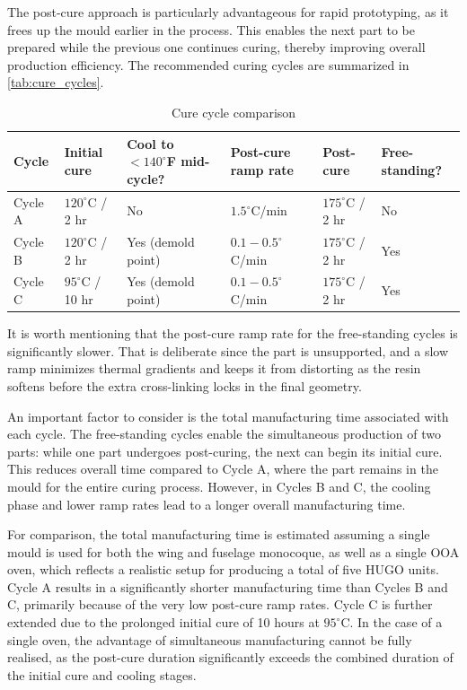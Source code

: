 The post-cure approach is particularly advantageous for rapid prototyping, as it frees up the mould earlier in the process. This enables the next part to be prepared while the previous one continues curing, thereby improving overall production efficiency. The recommended curing cycles are summarized in \autoref{tab:cure_cycles}.

\begin{table}[H]
\centering
\caption{Cure cycle comparison }
\label{tab:cure_cycles}
\begin{tabular}{|p{1.4cm}|p{2.0cm}|p{3.0cm}|p{2.6cm}|p{2.0cm}|p{2.2cm}|}
\hline
\textbf{Cycle} &
\textbf{Initial cure} &
\textbf{Cool to $<140^\circ$F mid-cycle?} &
\textbf{Post-cure ramp rate} &
\textbf{Post-cure} &
\textbf{Free-standing?} \\
\hline\hline
Cycle A & $120^\circ$C / 2 hr & No & $1.5^\circ$C/min & $175^\circ$C / 2 hr & No \\
\hline
Cycle B & $120^\circ$C / 2 hr & Yes (demold point) & $0.1-0.5^\circ$C/min & $175^\circ$C / 2 hr & Yes \\
\hline
Cycle C & $95^\circ$C / 10 hr & Yes (demold point) & $0.1-0.5^\circ$C/min & $175^\circ$C / 2 hr & Yes \\
\hline
\end{tabular}
\end{table}

It is worth mentioning that the post-cure ramp rate for the free-standing cycles is significantly slower. That is deliberate since the part is unsupported, and a slow ramp minimizes thermal gradients and keeps it from distorting as the resin softens before the extra cross-linking locks in the final geometry. 

An important factor to consider is the total manufacturing time associated with each cycle. The free-standing cycles enable the simultaneous production of two parts: while one part undergoes post-curing, the next can begin its initial cure. This reduces overall time compared to Cycle A, where the part remains in the mould for the entire curing process. However, in Cycles B and C, the cooling phase and lower ramp rates lead to a longer overall manufacturing time.

For comparison, the total manufacturing time is estimated assuming a single mould is used for both the wing and fuselage monocoque, as well as a single OOA oven, which reflects a realistic setup for producing a total of five HUGO units. Cycle A results in a significantly shorter manufacturing time than Cycles B and C, primarily because of the very low post-cure ramp rates. Cycle C is further extended due to the prolonged initial cure of 10 hours at $95^\circ$C. In the case of a single oven, the advantage of simultaneous manufacturing cannot be fully realised, as the post-cure duration significantly exceeds the combined duration of the initial cure and cooling stages.

